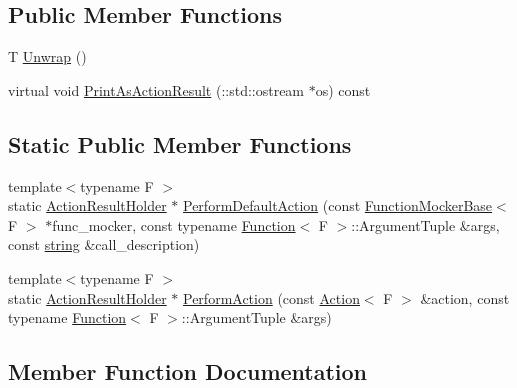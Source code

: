 \subsection*{Public Member Functions}
\begin{DoxyCompactItemize}
\item 
T \hyperlink{classtesting_1_1internal_1_1_action_result_holder_a057df6cceeeab9ea06e679bcf6b78960}{Unwrap} ()
\item 
virtual void \hyperlink{classtesting_1_1internal_1_1_action_result_holder_a06d1fb40fc863328dbcc102bc46dece4}{Print\+As\+Action\+Result} (\+::std\+::ostream $\ast$os) const
\end{DoxyCompactItemize}
\subsection*{Static Public Member Functions}
\begin{DoxyCompactItemize}
\item 
{\footnotesize template$<$typename F $>$ }\\static \hyperlink{classtesting_1_1internal_1_1_action_result_holder}{Action\+Result\+Holder} $\ast$ \hyperlink{classtesting_1_1internal_1_1_action_result_holder_a9609dcb5fb16271f83d777b087075272}{Perform\+Default\+Action} (const \hyperlink{classtesting_1_1internal_1_1_function_mocker_base}{Function\+Mocker\+Base}$<$ F $>$ $\ast$func\+\_\+mocker, const typename \hyperlink{structtesting_1_1internal_1_1_function}{Function}$<$ F $>$\+::Argument\+Tuple \&args, const \hyperlink{namespacetesting_1_1internal_a8e8ff5b11e64078831112677156cb111}{string} \&call\+\_\+description)
\item 
{\footnotesize template$<$typename F $>$ }\\static \hyperlink{classtesting_1_1internal_1_1_action_result_holder}{Action\+Result\+Holder} $\ast$ \hyperlink{classtesting_1_1internal_1_1_action_result_holder_a9e10aff754b5caf69b14964f3c9c79ec}{Perform\+Action} (const \hyperlink{classtesting_1_1_action}{Action}$<$ F $>$ \&action, const typename \hyperlink{structtesting_1_1internal_1_1_function}{Function}$<$ F $>$\+::Argument\+Tuple \&args)
\end{DoxyCompactItemize}


\subsection{Member Function Documentation}
\mbox{\label{classtesting_1_1internal_1_1_action_result_holder_a9e10aff754b5caf69b14964f3c9c79ec}} 
